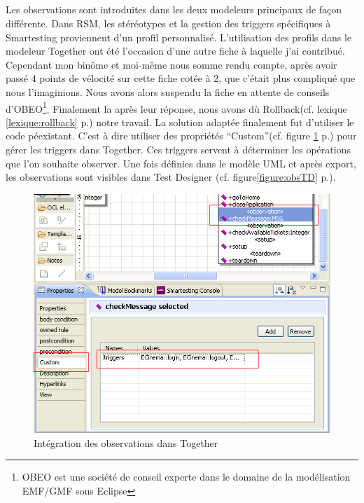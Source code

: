 \subparagraph*{}
Les observations sont introduites dans les deux modeleurs principaux de façon différente. Dans RSM, les stéréotypes et la gestion des triggers spécifiques à Smartesting proviennent d'un profil personnalisé. L'utilisation des profils dans le modeleur Together ont été l'occasion d'une autre fiche à laquelle j'ai contribué. Cependant mon binôme et moi-même nous somme rendu compte, après avoir passé 4 points de vélocité sur cette fiche cotée à 2, que c'était plus compliqué que nous l'imaginions. Nous avons alors suspendu la fiche en attente de conseils d'OBEO\footnote{OBEO est une société de conseil experte dans le domaine de la modélisation EMF/GMF sous Eclipse}. Finalement la après leur réponse, nous avons dù Rollback(cf. lexique \ref{lexique:rollback} p.\pageref{lexique:rollback}) notre travail. La solution adaptée finalement fut d'utiliser le code péexistant. C'est à dire utiliser des propriétés ``Custom''(cf. figure \ref{figure:obsTriggerTG} p.\pageref{figure:obsTriggerTG}) pour gérer les triggers dans Together. Ces triggers servent à déterminer les opérations que l'on souhaite observer. Une fois définies dans le modèle UML et après export, les observations sont visibles dans Test Designer (cf. figure\ref{figure:obsTD} p.\pageref{figure:obsTD}).

\begin{figure}[!ht]
\centering
\includegraphics[scale=0.5]{Illustrations/Observation_Trigger_Together.png}
\caption{Intégration des observations dans Together}
\label{figure:obsTriggerTG}
\end{figure}

